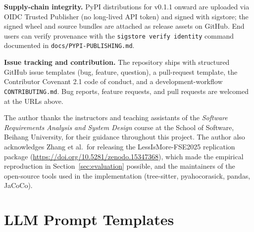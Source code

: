 \documentclass[acmlarge,nonacm,screen]{acmart}
\begin{document}
\textbf{Supply-chain integrity.}
PyPI distributions for v0.1.1 onward are uploaded via OIDC Trusted
Publisher (no long-lived API token) and signed with sigstore;
the signed wheel and source bundles are attached as release assets
on GitHub. End users can verify provenance with the
\texttt{sigstore verify identity} command documented in
\texttt{docs/PYPI-PUBLISHING.md}.

\textbf{Issue tracking and contribution.}
The repository ships with structured GitHub issue templates (bug,
feature, question), a pull-request template, the Contributor
Covenant 2.1 code of conduct, and a development-workflow
\texttt{CONTRIBUTING.md}. Bug reports, feature requests, and pull
requests are welcomed at the URLs above.

\begin{acks}
The author thanks the instructors and teaching assistants of the
\textit{Software Requirements Analysis and System Design} course at the
School of Software, Beihang University, for their guidance throughout
this project. The author also acknowledges Zhang et al.\ for releasing
the LessIsMore-FSE2025 replication package
(\url{https://doi.org/10.5281/zenodo.15347368}), which made the
empirical reproduction in Section~\ref{sec:evaluation} possible, and
the maintainers of the open-source tools used in the implementation
(tree-sitter, pyahocorasick, pandas, JaCoCo).
\end{acks}





\appendix

\section{LLM Prompt Templates}
\label{appendix:prompts}
\end{document}
